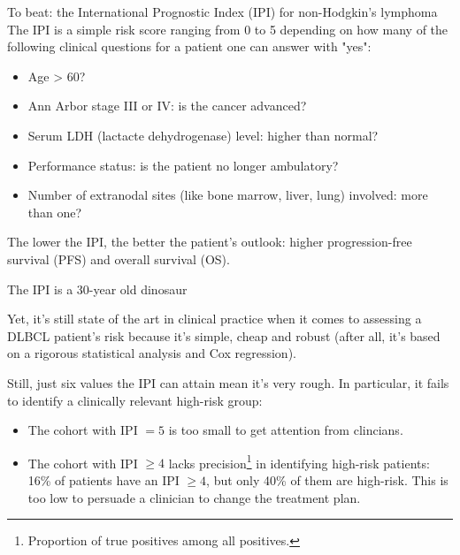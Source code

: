 \documentclass[10pt, aspectratio=169]{beamer}
\begin{document}
\begin{frame}{To beat: the International Prognostic Index (IPI) for non-Hodgkin's lymphoma}
  The IPI \autocite{ipi93} is a simple risk score ranging from 0 to 5 depending on how many of the following 
  \alert{clinical} questions for a patient one can answer with "yes": 

  \begin{itemize}
    \item Age > 60?
    \item Ann Arbor stage III or IV: is the cancer advanced?
    \item Serum LDH (lactacte dehydrogenase) level: higher than normal?
    \item Performance status: is the patient no longer ambulatory? 
    \item Number of extranodal sites (like bone marrow, liver, lung) involved: more than one?
  \end{itemize}

  The lower the IPI, the better the patient's outlook: higher progression-free survival (PFS) and 
  overall survival (OS).
\end{frame}

\begin{frame}{The IPI is a 30-year old dinosaur}

  Yet, it's still state of the art in clinical practice when it comes to assessing a DLBCL 
  patient's risk  because it's \alert{simple}, \alert{cheap} and 
  \alert{robust} (after all, it's based on a rigorous statistical analysis and Cox regression).

  Still, just six values the IPI can attain mean it's very rough. In particular, it fails 
  to identify a clinically relevant high-risk group:

  \begin{itemize}
    \item The cohort with IPI $= 5$ is \alert{too small} to get attention from clincians.
    \item The cohort with IPI $\geq 4$ \alert{lacks precision\footnote{Proportion of true 
      positives among all positives.} in identifying high-risk patients}: 16\% of patients have 
      an IPI $\geq 4$, but only 40\% of them are high-risk. This is too low to persuade 
      a clinician to change the treatment plan.
  \end{itemize}

\end{frame}
\end{document}
